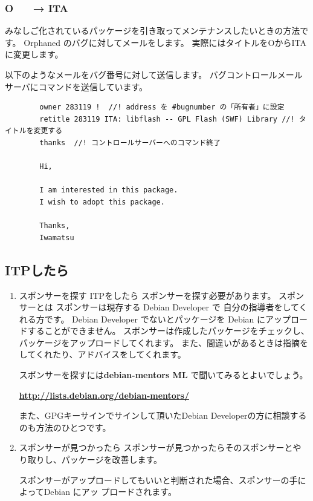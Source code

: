 \documentclass[mingoth]{jsarticle}
\begin{document}
    \subsubsection{ O　　→  ITA }
        みなしご化されているパッケージを引き取ってメンテナンスしたいときの方法です。
        Orphaned のバグに対してメールをします。
        実際にはタイトルをOからITAに変更します。
		
		以下のようなメールをバグ番号に対して送信します。
		バグコントロールメールサーバにコマンドを送信しています。

		\begin{verbatim}
        owner 283119 !	//! address を #bugnumber の「所有者」に設定
        retitle 283119 ITA: libflash -- GPL Flash (SWF) Library //! タイトルを変更する
        thanks	//! コントロールサーバーへのコマンド終了

        Hi,

        I am interested in this package.
        I wish to adopt this package.

        Thanks,
        Iwamatsu
		\end{verbatim}

		
\subsection{ITPしたら}

	\begin{enumerate}
    \item スポンサーを探す
        ITPをしたら スポンサーを探す必要があります。
        スポンサーとは スポンサーは現存する Debian Developer で 自分の指導者をしてくれる方です。
        Debian Developer でないとパッケージを Debian にアップロードすることができません。
        スポンサーは作成したパッケージをチェックし、パッケージをアップロードしてくれます。
        また、間違いがあるときは指摘をしてくれたり、アドバイスをしてくれます。
		
        スポンサーを探すには{\bf debian-mentors ML} で聞いてみるとよいでしょう。
		
        {\bf \url{http://lists.debian.org/debian-mentors/}}

        また、GPGキーサインでサインして頂いたDebian Developerの方に相談するのも方法のひとつです。
		
		
    \item スポンサーが見つかったら
        スポンサーが見つかったらそのスポンサーとやり取りし、パッケージを改善します。
		
        スポンサーがアップロードしてもいいと判断された場合、スポンサーの手によってDebian にアッ
        プロードされます。
	\end{enumerate}
\end{document}

